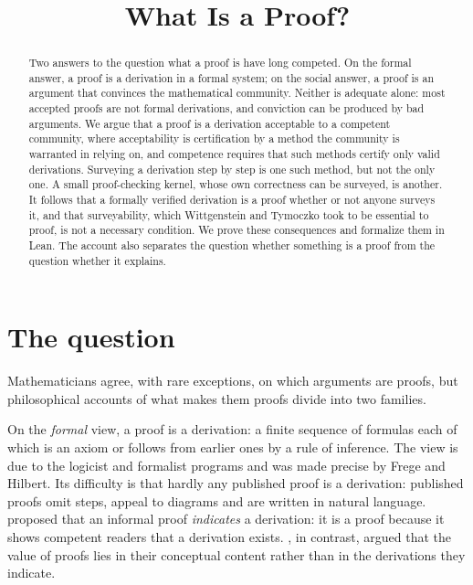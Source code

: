 \documentclass{situationist-preprint}
\title{What Is a Proof?}
\begin{document}
\maketitle

\begin{abstract}
Two answers to the question what a proof is have long competed. On the formal answer, a proof is a derivation in a formal system; on the social answer, a proof is an argument that convinces the mathematical community. Neither is adequate alone: most accepted proofs are not formal derivations, and conviction can be produced by bad arguments. We argue that a proof is a derivation acceptable to a competent community, where acceptability is certification by a method the community is warranted in relying on, and competence requires that such methods certify only valid derivations. Surveying a derivation step by step is one such method, but not the only one. A small proof-checking kernel, whose own correctness can be surveyed, is another. It follows that a formally verified derivation is a proof whether or not anyone surveys it, and that surveyability, which Wittgenstein and Tymoczko took to be essential to proof, is not a necessary condition. We prove these consequences and formalize them in Lean. The account also separates the question whether something is a proof from the question whether it explains.
\end{abstract}

\section{The question}

Mathematicians agree, with rare exceptions, on which arguments are proofs, but philosophical accounts of what makes them proofs divide into two families.

On the \emph{formal} view, a proof is a derivation: a finite sequence of formulas each of which is an axiom or follows from earlier ones by a rule of inference. The view is due to the logicist and formalist programs and was made precise by Frege and Hilbert. Its difficulty is that hardly any published proof is a derivation: published proofs omit steps, appeal to diagrams and are written in natural language. \citet{Azzouni2004} proposed that an informal proof \emph{indicates} a derivation: it is a proof because it shows competent readers that a derivation exists. \citet{Rav1999}, in contrast, argued that the value of proofs lies in their conceptual content rather than in the derivations they indicate.
\end{document}
